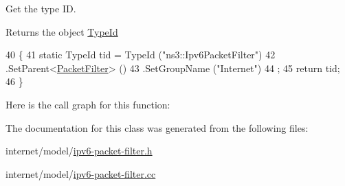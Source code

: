 Get the type ID. 

\begin{DoxyReturn}{Returns}
the object \hyperlink{classns3_1_1TypeId}{Type\+Id} 
\end{DoxyReturn}

\begin{DoxyCode}
40 \{
41   \textcolor{keyword}{static} TypeId tid = TypeId (\textcolor{stringliteral}{"ns3::Ipv6PacketFilter"})
42     .SetParent<\hyperlink{classns3_1_1PacketFilter_a4c9b19f4b91684d30d8a769489b534e7}{PacketFilter}> ()
43     .SetGroupName (\textcolor{stringliteral}{"Internet"})
44   ;
45   \textcolor{keywordflow}{return} tid;
46 \}
\end{DoxyCode}


Here is the call graph for this function\+:




The documentation for this class was generated from the following files\+:\begin{DoxyCompactItemize}
\item 
internet/model/\hyperlink{ipv6-packet-filter_8h}{ipv6-\/packet-\/filter.\+h}\item 
internet/model/\hyperlink{ipv6-packet-filter_8cc}{ipv6-\/packet-\/filter.\+cc}\end{DoxyCompactItemize}
